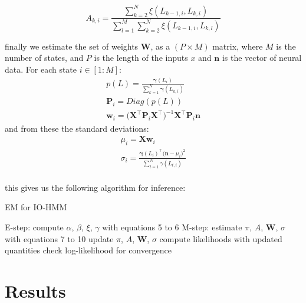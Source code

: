 \documentclass{article}
\begin{document}
\begin{equation}
    A_{k, i} = \frac{\sum_{k=2}^N \xi(L_{k-1, i}, L_{k, i})}{\sum_{l=1}^M \sum_{k=2}^N \xi(L_{k-1, i}, L_{k, l})}
\end{equation}

\noindent
finally we estimate the set of weights $\boldsymbol{W}$, as a $(P \times M)$ matrix, where $M$ is the number of states, and $P$ is the length of the inputs $x$ and $\boldsymbol{n}$ is the vector of neural data. For each state $i \in [1:M]$: 
\begin{equation}
 \begin{aligned}
    p(L) = \frac{\boldsymbol{\gamma}(L_i)}{\sum_{k=1}^N \boldsymbol{\gamma}(L_{k, i})} \\ 
    \boldsymbol{P}_{i} = Diag(p(L))\\
    \boldsymbol{w}_i = \Big(\boldsymbol{X}^{\top} \boldsymbol{P}_{i} \boldsymbol{X}^{\top} \Big)^{-1}\boldsymbol{X}^{\top}\boldsymbol{P}_{i}\boldsymbol{n}
\end{aligned}
\end{equation}
\noindent
and from these the standard deviations: 
\begin{equation}
 \begin{aligned}
     \mu_i = \boldsymbol{X} \boldsymbol{w}_i \\ 
     \sigma_i = \frac{\boldsymbol{\gamma}(L_i)^{\top} \big(\boldsymbol{n} - \mu_i \big)^2}{\sum_{t=1}^N \gamma(L_{t, i})}\\
\end{aligned}
\end{equation}

this gives us the following algorithm for inference: 

\begin{algorithm}
	\caption{EM for IO-HMM} 
	\begin{algorithmic}[1]
			    \State E-step: compute $\alpha$, $\beta$, $\xi$, $\gamma$ with equations 5 to 6
			    \State M-step: estimate $\pi$, $A$, $\boldsymbol{W}$, $\sigma$ with equations 7 to 10
			    \State update $\pi$, $A$, $\boldsymbol{W}$, $\sigma$
			    \State compute likelihoods with updated quantities
			    \State check log-likelihood for convergence
		\EndFor
	\end{algorithmic} 
\end{algorithm}

\section{Results}
\label{gen_inst}
\end{document}
